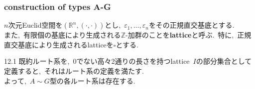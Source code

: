 \documentclass[uplatex,dvipdfmx]{jsarticle}
\begin{document}
\subsubsection{construction of types A-G}
$n$次元Euclid空間を$(\mathbb{R}^n, (\cdot, \cdot))$とし,~$\varepsilon_1, \dots, \varepsilon_n$をその正規直交基底とする.\\
また,~有限個の基底により生成される$\mathbb{Z}$-加群のことを\textbf{lattice}と呼ぶ.~特に,~正規直交基底により生成されるlatticeを$\square$とする.\\
\begin{mythm}{12.1} 
    既約ルート系を,~$0$でない高々2通りの長さを持つlattice~$I$の部分集合として定義すると,~それはルート系の定義を満たす.\\
    よって,~$A\sim G$型の各ルート系は存在する.
\end{mythm}
\end{document}
